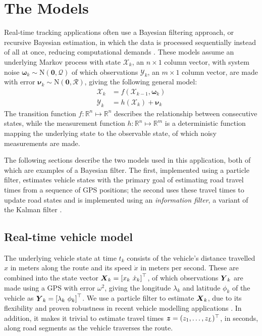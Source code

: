 \section{The Models}
\label{sec:models}

Real-time tracking applications often use
a Bayesian filtering approach,
or recursive Bayesian estimation,
in which the data is processed sequentially instead of all at once,
reducing computational demands
\citep{Anderson_2012}.
These models assume an underlying Markov process with state $\boldsymbol{\mathcal{X}}_k$,
an $n\times1$ column vector,
with system noise $\boldsymbol{\omega}_k\sim\mathrm{N}(\boldsymbol{0},\mathcal{Q})$ 
of which observations $\boldsymbol{\mathcal{Y}}_k$,
an $m\times1$ column vector, are made
with error $\boldsymbol{\nu}_k\sim\mathrm{N}(\boldsymbol{0},\mathcal{R})$,
giving the following general model:
\begin{equation}
\label{eq:rbe_model}
\begin{split}
\boldsymbol{\mathcal{X}}_k &= f(\boldsymbol{\mathcal{X}}_{k-1}, \boldsymbol{\omega}_k) \\
\boldsymbol{\mathcal{Y}}_k &= h(\boldsymbol{\mathcal{X}}_k) + \boldsymbol{\nu}_k
\end{split}
\end{equation}
The transition function $f:\mathbb{R}^n\mapsto\mathbb{R}^n$ 
describes the relationship between consecutive states,
while the measurement function $h:\mathbb{R}^n\mapsto\mathbb{R}^m$ is a deterministic function
mapping the underlying state to the observable state,
of which noisy measurements are made.



The following sections describe the two models used in this application,
both of which are examples of a Bayesian filter.
The first, implemented using a particle filter, estimates vehicle states
with the primary goal of estimating road travel times from a sequence of GPS positions;
the second uses these travel times to update road states 
and is implemented using an \emph{information filter},
a variant of the Kalman filter \citep{Anderson_2012}.



\subsection{Real-time vehicle model}
\label{sec:pf}

The underlying vehicle state at time $t_k$ consists of
the vehicle's distance travelled $x$ in meters along the route and
its speed $\dot x$ in meters per second.
These are combined into the state vector
$\mbox{$\boldsymbol{X}$}_k = \left[x_k\ \dot x_k\right]^\top$,
of which observations $\mbox{$\boldsymbol{Y}$}_k$ are made using a GPS
with error $\omega^2$,
giving the longitude $\lambda_k$ and latitude $\phi_k$ of the vehicle
as $\bY_k = \left[\lambda_k\ \phi_k \right]^\top$.
We use a particle filter to estimate $\mbox{$\boldsymbol{X}$}_k$,
due to its flexibility and proven robustness
in recent vehicle modelling applications \citep{Ulmke_2006,Hans_2015}.
In addition, it makes it trivial to estimate travel times
$\boldsymbol{z} = (z_1,\ldots,z_L)^\top$, in seconds, along road segments
as the vehicle traverses the route.


